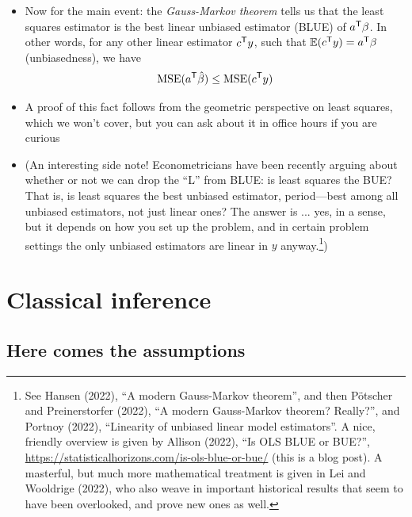 \documentclass{article}
\begin{document}
\begin{itemize}
\item Now for the main event: the \emph{Gauss-Markov theorem} tells us that
  the least squares estimator is the best linear unbiased estimator (BLUE) of
  $a^{\mathsf{T}} \beta$. In other words, for any other linear estimator $c^{\mathsf{T}} y$, such
  that $\mathbb{E}(c^{\mathsf{T}} y) = a^{\mathsf{T}} \beta$ (unbiasedness), we have  
  \[
  \mathrm{MSE}(a^{\mathsf{T}} \hat{\beta}) \leq \mathrm{MSE}(c^{\mathsf{T}} y)
  \]

\item A proof of this fact follows from the geometric perspective on least
  squares, which we won't cover, but you can ask about it in office hours if you
  are curious  

\item (An interesting side note! Econometricians have been recently arguing about 
  whether or not we can drop the ``L'' from BLUE: is least squares the BUE? That
  is, is least squares the best unbiased estimator, period---best among all
  unbiased estimators, not just linear ones? The answer is ... yes, in a sense,
  but it depends on how you set up the problem, and in certain problem settings
  the only unbiased estimators are linear in $y$ anyway.\footnote{See Hansen
    (2022), ``A modern Gauss-Markov theorem'', and then P{\"o}tscher and
    Preinerstorfer (2022), ``A modern Gauss-Markov theorem? Really?'', and
    Portnoy (2022), ``Linearity  of unbiased linear model estimators''. A nice,
    friendly overview is given by Allison (2022), ``Is OLS BLUE or BUE?'',
    \url{https://statisticalhorizons.com/is-ols-blue-or-bue/} (this is a blog
    post). A masterful, but much more mathematical treatment is given in Lei and
    Wooldrige (2022), who also weave in important historical results that seem
    to have been overlooked, and prove new ones as well.})
\end{itemize}

\section{Classical inference}

\subsection{Here comes the assumptions}

\def\iidsim{\overset{\text{iid}}{\sim}}
\end{document}
